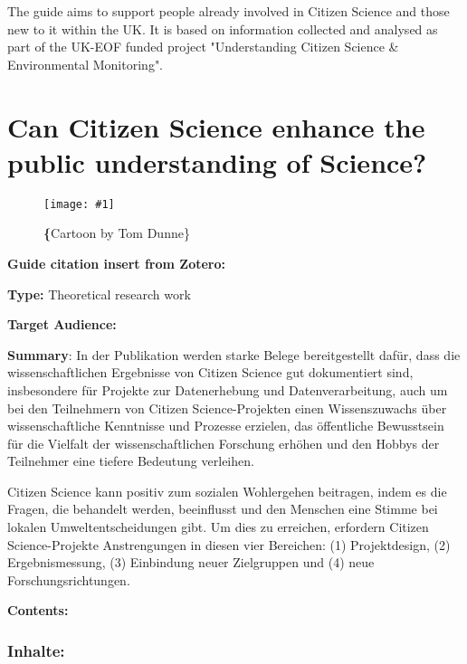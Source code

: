 \documentclass{article}
\newlength{\imgwidth}
\newcommand\scaledgraphics[2]{%
                
\settowidth{\imgwidth}{\texttt{[image: \#1]}}%
                
\setlength{\imgwidth}{\minof{\imgwidth}{#2\textwidth}}%
                
\texttt{[image: \#1]}%
                
}
\begin{document}
The guide aims to support people already involved in Citizen Science and those new to it within the UK. It is based on information collected and analysed as part of the UK-EOF funded project "Understanding Citizen Science \& Environmental Monitoring".


\section{Can Citizen Science enhance the public understanding of Science?}\label{H2333653}



\begin{center}
\begin{figure}
\scaledgraphics{fb9872a4-8371-4bfe-a930-f1d621c5649e.png}{0.5}
\caption*{\textbf\{Cartoon by Tom Dunne\}}\label{F26530171}
\end{figure}


\end{center}





\textbf{Guide citation insert from Zotero:} \autocite{bonney_can_2015}


\textbf{Type: }Theoretical research work


\textbf{Target Audience:}


\textbf{Summary}: In der Publikation werden starke Belege bereitgestellt dafür, dass die wissenschaftlichen Ergebnisse von Citizen Science gut dokumentiert sind, insbesondere für Projekte zur Datenerhebung und Datenverarbeitung, auch um bei den Teilnehmern von Citizen Science-Projekten einen Wissenszuwachs über wissenschaftliche Kenntnisse und Prozesse erzielen, das öffentliche Bewusstsein für die Vielfalt der wissenschaftlichen Forschung erhöhen und den Hobbys der Teilnehmer eine tiefere Bedeutung verleihen. 


Citizen Science kann positiv zum sozialen Wohlergehen beitragen, indem es die Fragen, die behandelt werden, beeinflusst und den Menschen eine Stimme bei lokalen Umweltentscheidungen gibt. Um dies zu erreichen, erfordern Citizen Science-Projekte Anstrengungen in diesen vier Bereichen: (1) Projektdesign, (2) Ergebnismessung, (3) Einbindung neuer Zielgruppen und (4) neue Forschungsrichtungen.


\textbf{Contents:}


\subsubsection{Inhalte: }\label{H3778084}
\end{document}
